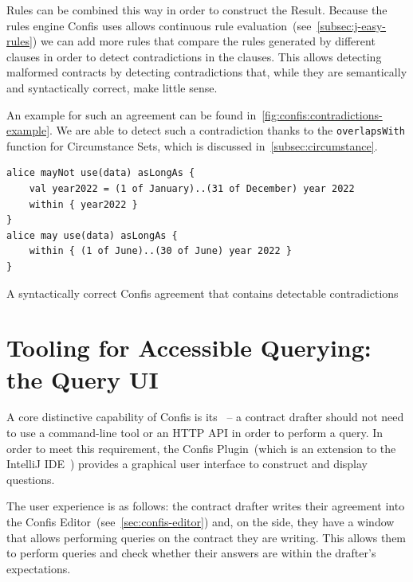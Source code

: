 Rules can be combined this way in order to construct the Result.
Because the rules engine Confis uses allows continuous rule evaluation~(see~\autoref{subsec:j-easy-rules}) we can add more rules that compare the rules generated by different clauses in order to detect contradictions in the clauses.
This allows detecting malformed contracts by detecting contradictions that, while they are semantically and syntactically correct, make little sense.

An example for such an agreement can be found in~\autoref{fig:confis:contradictions-example}.
We are able to detect such a contradiction thanks to the \texttt{overlapsWith} function for Circumstance Sets, which is discussed in~\autoref{subsec:circumstance}.


\begin{listing}[h]
    \centering
    \begin{verbatim}
alice mayNot use(data) asLongAs {
    val year2022 = (1 of January)..(31 of December) year 2022
    within { year2022 }
}
alice may use(data) asLongAs {
    within { (1 of June)..(30 of June) year 2022 }
}
    \end{verbatim}
    \caption{A syntactically correct Confis agreement that contains detectable contradictions}
    \label{fig:confis:contradictions-example}
\end{listing}




\section[Query UI]{Tooling for Accessible Querying: the Query UI}\label{sec:queryUI}

A core distinctive capability of Confis is its~ -- a contract drafter should not need to use a command-line tool or an HTTP API in order to perform a query.
In order to meet this requirement, the Confis Plugin~(which is an extension to the IntelliJ IDE~\cite{intelliJRepo, ideaExtensionPoints}) provides a graphical user interface to construct and display questions.

The user experience is as follows: the contract drafter writes their agreement into the Confis Editor~(see~\autoref{sec:confis-editor}) and, on the side, they have a window that allows performing queries on the contract they are writing.
This allows them to perform queries and check whether their answers are within the drafter's expectations.

